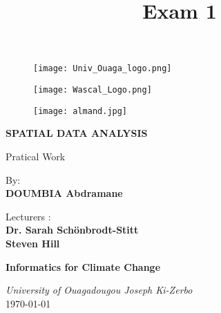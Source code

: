 \documentclass[11pt,a4paper]{article}
\title{Exam  1}
\begin{document}
  \begin{titlepage}
  
\begin{figure}[!htb]
   \begin{minipage}{0.3\textwidth}
     \centering
     \texttt{[image: Univ\_Ouaga\_logo.png]}
   \end{minipage}\hfill
   \begin{minipage}{0.3\textwidth}
     \centering
     \texttt{[image: Wascal\_Logo.png]}
   \end{minipage}
   \begin{minipage}{0.3\textwidth}
     \centering
     \texttt{[image: almand.jpg]}
   \end{minipage}
\end{figure}
  \vspace{3cm}
  
\centering
{\LARGE\bfseries SPATIAL DATA ANALYSIS \\}

\vspace{1cm}

{\Large Pratical Work}

\vspace{1cm}
\begin{flushleft}
By: \\
\vspace{0.2cm}
{\large\bfseries DOUMBIA Abdramane}
\end{flushleft}
 
\begin{flushright}
	Lecturers : \\
	\vspace{0.2cm}
	\large\bfseries Dr. Sarah Schönbrodt-Stitt \\
	Steven Hill
\end{flushright}

\vspace{2cm}

{\bfseries Informatics for Climate Change }
\vspace{1cm}


{\itshape University of Ouagadougou Joseph Ki-Zerbo} \\
\vspace{1cm}
\today
\end{titlepage} 



{
\hypersetup{linkcolor=black}
\tableofcontents

}
{
\hypersetup{linkcolor=black}
\newpage      
\listoffigures
}
\newpage
  
\end{document}
